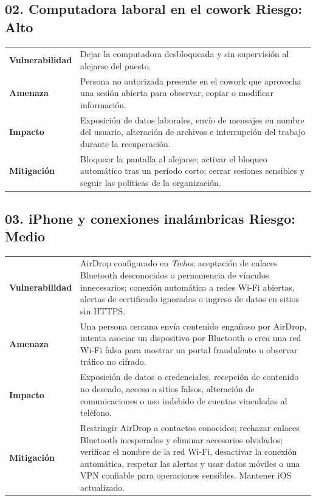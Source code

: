 \documentclass[11pt,a4paper]{article}
\newcommand{\riskfield}[2]{\textcolor{azul}{\textbf{#1}} & #2\\[2pt]}
\begin{document}
\subsection*{02. Computadora laboral en el cowork \hfill \textcolor{turquesa}{Riesgo: Alto}}
\begin{tabularx}{\textwidth}{>{\raggedright\arraybackslash}p{2.6cm} >{\raggedright\arraybackslash}X}
  \riskfield{Vulnerabilidad}{Dejar la computadora desbloqueada y sin supervisión al alejarse del puesto.}
  \riskfield{Amenaza}{Persona no autorizada presente en el cowork que aprovecha una sesión abierta para observar, copiar o modificar información.}
  \riskfield{Impacto}{Exposición de datos laborales, envío de mensajes en nombre del usuario, alteración de archivos e interrupción del trabajo durante la recuperación.}
  \riskfield{Mitigación}{Bloquear la pantalla al alejarse; activar el bloqueo automático tras un período corto; cerrar sesiones sensibles y seguir las políticas de la organización.}
\end{tabularx}

\subsection*{03. iPhone y conexiones inalámbricas \hfill \textcolor{turquesa}{Riesgo: Medio}}
\begin{tabularx}{\textwidth}{>{\raggedright\arraybackslash}p{2.6cm} >{\raggedright\arraybackslash}X}
  \riskfield{Vulnerabilidad}{AirDrop configurado en \textit{Todos}; aceptación de enlaces Bluetooth desconocidos o permanencia de vínculos innecesarios; conexión automática a redes Wi-Fi abiertas, alertas de certificado ignoradas o ingreso de datos en sitios sin HTTPS.}
  \riskfield{Amenaza}{Una persona cercana envía contenido engañoso por AirDrop, intenta asociar un dispositivo por Bluetooth o crea una red Wi-Fi falsa para mostrar un portal fraudulento u observar tráfico no cifrado.}
  \riskfield{Impacto}{Exposición de datos o credenciales, recepción de contenido no deseado, acceso a sitios falsos, alteración de comunicaciones o uso indebido de cuentas vinculadas al teléfono.}
  \riskfield{Mitigación}{Restringir AirDrop a contactos conocidos; rechazar enlaces Bluetooth inesperados y eliminar accesorios olvidados; verificar el nombre de la red Wi-Fi, desactivar la conexión automática, respetar las alertas y usar datos móviles o una VPN confiable para operaciones sensibles. Mantener iOS actualizado.}
\end{tabularx}
\normalsize
\end{document}
